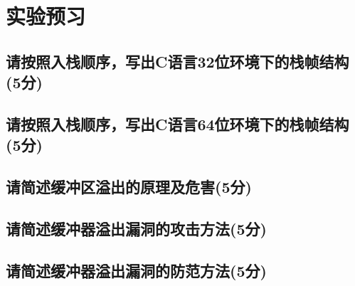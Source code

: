\section{实验预习}
\subsection{请按照入栈顺序，写出C语言32位环境下的栈帧结构(5分)}

\subsection{请按照入栈顺序，写出C语言64位环境下的栈帧结构(5分)}

\subsection{请简述缓冲区溢出的原理及危害(5分)}

\subsection{请简述缓冲器溢出漏洞的攻击方法(5分)}

\subsection{请简述缓冲器溢出漏洞的防范方法(5分)}


